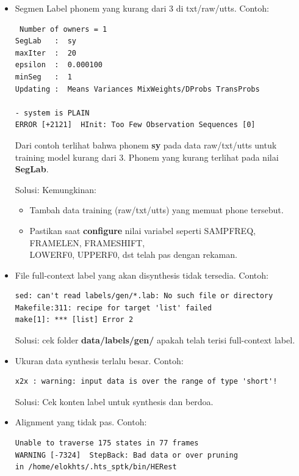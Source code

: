 \documentclass[12pt,]{article}
\begin{document}
	\begin{itemize}
		\item Segmen Label phonem yang kurang dari 3 di txt/raw/utts.
		Contoh:
		\begin{verbatim}
 Number of owners = 1
SegLab   :  sy
maxIter  :  20
epsilon  :  0.000100
minSeg   :  1
Updating :  Means Variances MixWeights/DProbs TransProbs

- system is PLAIN
ERROR [+2121]  HInit: Too Few Observation Sequences [0]
		\end{verbatim}

		Dari contoh terlihat bahwa phonem \textbf{sy} pada data raw/txt/utts untuk training model kurang dari 3.
		Phonem yang kurang terlihat pada nilai \textbf{SegLab}.

		Solusi: Kemungkinan:
		\begin{itemize}
			\item Tambah data training (raw/txt/utts) yang memuat phone tersebut.
			\item Pastikan saat \textbf{configure} nilai variabel seperti SAMPFREQ, FRAMELEN, FRAMESHIFT,\\
			LOWERF0, UPPERF0, dst telah pas dengan rekaman.
		\end{itemize}


		\item File full-context label yang akan disynthesis tidak tersedia.
		Contoh:
		\begin{verbatim}
sed: can't read labels/gen/*.lab: No such file or directory
Makefile:311: recipe for target 'list' failed
make[1]: *** [list] Error 2
		\end{verbatim}

		Solusi: cek folder \textbf{data/labels/gen/} apakah telah terisi full-context label.

		\item Ukuran data synthesis terlalu besar.
		Contoh:
		\begin{verbatim}
x2x : warning: input data is over the range of type 'short'!
		\end{verbatim}

		Solusi: Cek konten label untuk synthesis dan berdoa.

		\item Alignment yang tidak pas.
		Contoh:
		\begin{verbatim}
Unable to traverse 175 states in 77 frames
WARNING [-7324]  StepBack: Bad data or over pruning
in /home/elokhts/.hts_sptk/bin/HERest
		\end{verbatim}


\end{itemize}
\end{document}
